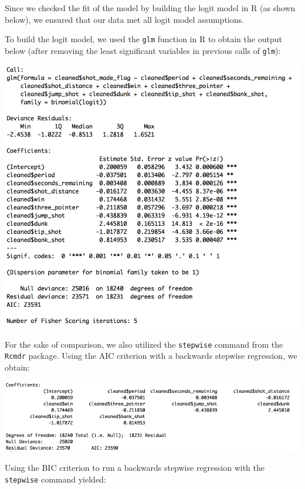 \documentclass[paper=a4, fontsize=11pt]{scrartcl} %
\numberwithin{equation}{section} %
\numberwithin{figure}{section} %
\numberwithin{table}{section} %
\begin{document}
\hspace*{1cm}Since we checked the fit of the model by building the logit model in R (as shown below), we ensured that our data met all logit model assumptions. 

\hspace*{1cm}To build the logit model, we used the \texttt{glm} function in R to obtain the output below (after removing the least significant variables in previous calls of \texttt{glm}): 
\begin{center}
	\includegraphics[width=14cm]{img/logit1}
\end{center}
\hspace*{1cm} For the sake of comparison, we also utilized the \texttt{stepwise} command from the \texttt{Rcmdr}
package. Using the AIC criterion with a backwards stepwise regression, we obtain: 
\begin{center}
	\includegraphics[width=14cm]{img/logitaic}
\end{center}
\hspace*{1cm}Using the BIC criterion to run a backwards stepwise regression with the \texttt{stepwise} command yielded:
\end{document}
